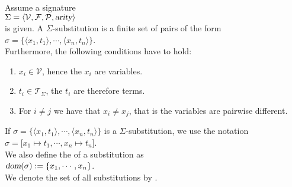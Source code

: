 \begin{Definition}[Substitution]
    Assume a signature \\[0.2cm]
    \hspace*{1.3cm}
    $\Sigma = \langle \mathcal{V}, \mathcal{F}, \mathcal{P}, \textsl{arity} \rangle$
    \\[0.2cm]
    is given.  A {\color{blue}$\Sigma$-substitution} is a finite set of pairs of the form
    \\[0.2cm]
    \hspace*{1.3cm}
    $\sigma = \bigl\{ \langle x_1, t_1 \rangle, \cdots, \langle x_n, t_n \rangle \bigr\}$.
    \\[0.2cm]
    Furthermore, the following conditions have to hold:
    \begin{enumerate}
    \item $x_i \in \mathcal{V}$, hence the $x_i$ are variables.
    \item $t_i \in \mathcal{T}_\Sigma$, the $t_i$ are therefore terms.
    \item For $i\not=j$ we have that $x_i \not= x_j$, that is the variables are pairwise different.
    \end{enumerate}
    
    If $\sigma = \bigl\{ \langle x_1, t_1 \rangle, \cdots, \langle x_n, t_n \rangle \bigr\}$ is a
    $\Sigma$-substitution, we use the notation \\[0.2cm]
    \hspace*{1.3cm} $\sigma = \bigl[ x_1 \mapsto t_1, \cdots, x_n \mapsto t_n \bigr]$.  \\[0.2cm]
    We also define the  of a substitution as \\[0.2cm]
    \hspace*{1.3cm} $\textsl{dom}(\sigma) := \{ x_1, \cdots, x_n\}$.
    \\[0.2cm]
    We denote the set of all substitutions by .
    \eox
\end{Definition}

